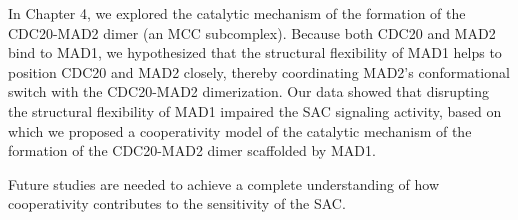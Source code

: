 In Chapter 4, we explored the catalytic mechanism of the formation of the CDC20-MAD2 dimer (an MCC subcomplex). Because both CDC20 and MAD2 bind to MAD1, we hypothesized that the structural flexibility of MAD1 helps to position CDC20 and MAD2 closely, thereby coordinating MAD2's conformational switch with the CDC20-MAD2 dimerization. Our data showed that disrupting the structural flexibility of MAD1 impaired the SAC signaling activity, based on which we proposed a cooperativity model of the catalytic mechanism of the formation of the CDC20-MAD2 dimer scaffolded by MAD1.

Future studies are needed to achieve a complete understanding of how cooperativity contributes to the sensitivity of the SAC.